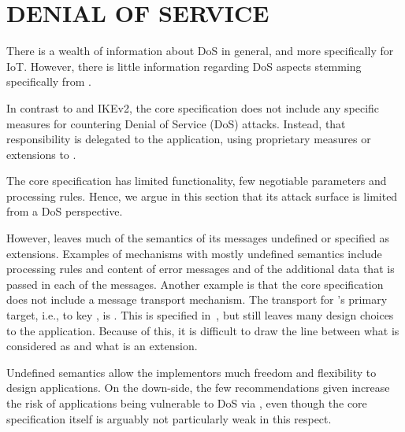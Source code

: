 \documentclass[runningheads]{llncs}
\begin{document}
\section{\uppercase{Denial of Service}}
\label{sec:dos}

There is a wealth of information about DoS in general, and more specifically for
IoT.
%
However, there is little information regarding DoS aspects stemming
specifically from \mEdhoc{}.
%

In contrast to \mTls{} and IKEv2,
the \mEdhoc{} core specification does not include any specific measures for
countering Denial of Service (DoS) attacks.
%
Instead, that responsibility is delegated to the application, using
proprietary measures or extensions to \mEdhoc{}.
%

The \mEdhoc{} core specification has limited functionality, few negotiable
parameters and processing rules.
%
Hence, we argue in this section that its attack surface
is limited from a DoS perspective.
%

However, \mEdhoc{} leaves much of the semantics of its messages undefined or
specified as extensions.
%
Examples of mechanisms with mostly undefined semantics include processing
rules and content of error messages and of the additional data that is
passed in each of the \mEdhoc{} messages.
%
Another example is that the core specification does not include a
message transport mechanism.
%
The transport for \mEdhoc's primary target, i.e., to key \mOscore{},
is \mCoap{}.
%
This is specified in~\cite{ietf-core-oscore-edhoc-03}, but still leaves
many design choices to the application.
%
Because of this, it is difficult to draw the line between what is considered as
\mEdhoc{} and what is an extension.
%

Undefined semantics allow the implementors much freedom
and flexibility to design applications.
%
On the down-side, the few recommendations given increase the risk of
applications being vulnerable to DoS via \mEdhoc{}, even
though the core \mEdhoc{} specification itself is arguably not particularly
weak in this respect.
%
\end{document}
